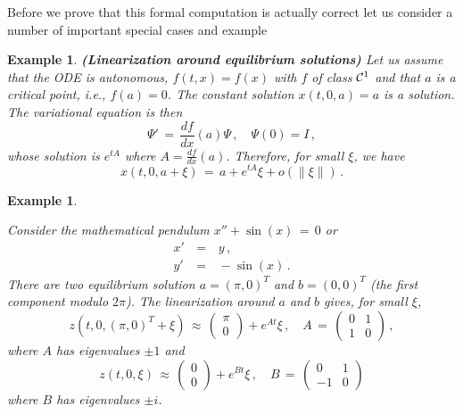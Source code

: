 \documentclass[12pt]{report}
\newcommand{\calC}{{\cal C}}
\newtheorem{example}[theorem]{Example}
\newcommand{\nn}{\nonumber}
\begin{document}
Before we prove that this formal computation is actually correct let
us consider a number of important special cases and example

\begin{example}{\bf (Linearization around equilibrium solutions)}{\rm 
Let us assume that the ODE is autonomous, $f(t,x)=f(x)$ with $f$ of class $\calC^1$ 
and  that $a$ is a critical point, i.e., $f(a)=0$. The constant solution
$x(t,0,a)=a$ is a solution.  The variational equation is then
\begin{equation}
\Psi' \,=\, \frac{df}{dx}(a)\Psi\,, \quad \Psi(0)=I \,, 
 \end{equation}
whose solution is $e^{tA}$ where $A=\frac{df}{dx}(a)$. Therefore, 
for small $\xi$, we have 
\begin{equation}
x(t,0, a+\xi)\,=\, a + e^{tA} \xi +o(\|\xi\|)  \,.
\end{equation}
}
\end{example}

\begin{example}\label{mathpend0}{\rm Consider the mathematical pendulum 
$x''+\sin(x)\,=\,0$ or
\begin{eqnarray} 
x'\,&=&\, y \,,\nn \\
y'\,&=&\, -\sin(x)  \,.
\end{eqnarray}
There are two equilibrium solution $a=(\pi, 0)^T$ and $b= (0, 0)^T$
(the first component modulo $2\pi$).  The linearization around $a$ and
$b$ gives, for small $\xi$,
\begin{equation}
z(t,0,(\pi,0)^T+\xi )\,\approx \, 
\left(\begin{array}{c}\pi \\ 0 \end{array} \right)  + e^{At} \xi \,, 
\quad A\,=\, \left( \begin{array}{cc} 0 & 1 \\ 1 & 0 \end{array} \right) \,,
\end{equation}
where $A$ has eigenvalues $\pm 1$ and 
\begin{equation}
z(t,0,\xi) \,\approx \, \left(\begin{array}{c} 0 \\ 0 \end{array} \right) +
e^{Bt} \xi \,, \quad B\,=\, \left( \begin{array}{cc} 0 & 1 \\ -1 & 0
\end{array} \right)
\end{equation}
where $B$ has eigenvalues $\pm i$. 

}
\end{example}
\end{document}
